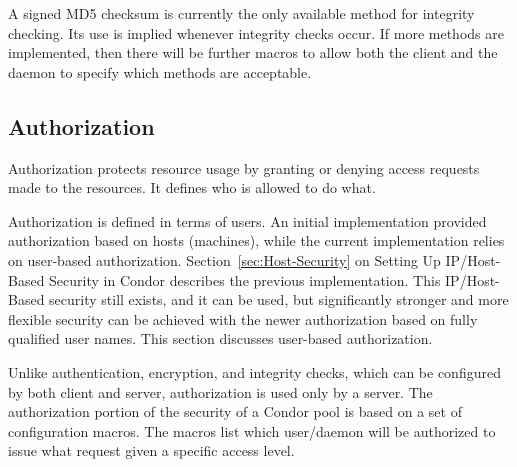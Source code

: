 A signed MD5 checksum is currently the only available method
for integrity checking.
Its use is implied whenever integrity checks occur.
If more methods are implemented, then there will be further
macros to allow both the client and the daemon to specify
which methods are acceptable.

\subsection{\label{sec:Security-Authorization}Authorization}

Authorization protects resource usage by granting or denying
access requests made to the resources.
It defines who is allowed to do what.

Authorization is defined in terms of users.
An initial implementation provided authorization
based on hosts (machines), while the current implementation
relies on user-based authorization.
Section~\ref{sec:Host-Security}
on Setting Up IP/Host-Based Security in Condor describes the
previous implementation.
This IP/Host-Based security still exists, and it can be used,
but significantly stronger and more flexible
security can be achieved with the newer
authorization based on fully qualified user names.
This section discusses user-based authorization. 


Unlike authentication, encryption, and integrity checks,
which can be configured by both client and server,
authorization is used only by a server.
The authorization portion of the security of a Condor pool is
based on a set of configuration macros.
The macros list which user/daemon will be authorized
to issue what request given a specific access level.

